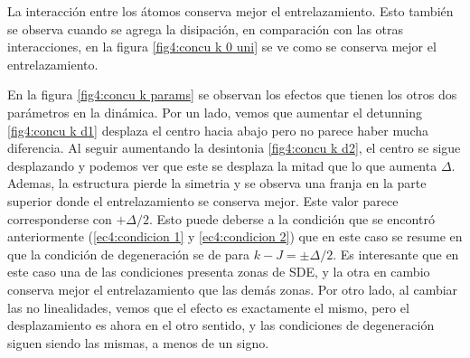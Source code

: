 La interacción entre los átomos conserva mejor el entrelazamiento. Esto también se observa cuando se agrega la disipación, en comparación con las otras interacciones, en la figura \ref{fig4:concu k 0 uni} se ve como se conserva mejor el entrelazamiento.

En la figura \ref{fig4:concu k params} se observan los efectos que tienen los otros dos parámetros en la dinámica. Por un lado, vemos que aumentar el detunning \ref{fig4:concu k d1} desplaza el centro hacia abajo pero no parece haber mucha diferencia. Al seguir aumentando la desintonia \ref{fig4:concu k d2}, el centro se sigue desplazando y podemos ver que este se desplaza la mitad que lo que aumenta $\Delta$. Ademas, la estructura pierde la simetria y se observa una franja en la parte superior donde el entrelazamiento se conserva mejor. Este valor parece corresponderse con $+\Delta/2$. Esto puede deberse a la condición que se encontró anteriormente (\ref{ec4:condicion 1} y \ref{ec4:condicion 2}) que en este caso se resume en que la condición de degeneración se de para $k-J=\pm\Delta/2$. Es interesante que en este caso una de las condiciones presenta zonas de SDE, y la otra en cambio conserva mejor el entrelazamiento que las demás zonas. Por otro lado, al cambiar las no linealidades, vemos que el efecto es exactamente el mismo, pero el desplazamiento es ahora en el otro sentido, y las condiciones de degeneración siguen siendo las mismas, a menos de un signo.
